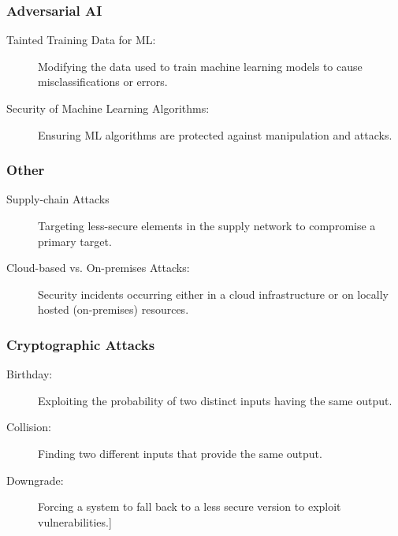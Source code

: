 \subsubsection*{\color{purple}Adversarial AI}
\begin{fullwidth}
    \begin{description}
        \item[Tainted Training Data for ML:] Modifying the data used to train machine learning models to cause misclassifications or errors.
        \item[Security of Machine Learning Algorithms:] Ensuring ML algorithms are protected against manipulation and attacks.
    \end{description}
\end{fullwidth}

\subsubsection*{\color{purple}Other}
\begin{fullwidth}
    \begin{description}
        \item[Supply-chain Attacks] Targeting less-secure elements in the supply network to compromise a primary target.
        \item[Cloud-based vs. On-premises Attacks:] Security incidents occurring either in a cloud infrastructure or on locally hosted (on-premises) resources.
    \end{description}
\end{fullwidth}

\subsubsection*{\color{purple}Cryptographic Attacks}
\begin{fullwidth}
    \begin{description}
        \item[Birthday:] Exploiting the probability of two distinct inputs having the same output.
        \item[Collision:] Finding two different inputs that provide the same output.
        \item[Downgrade:] Forcing a system to fall back to a less secure version to exploit vulnerabilities.]
    \end{description}
\end{fullwidth}
\newpage